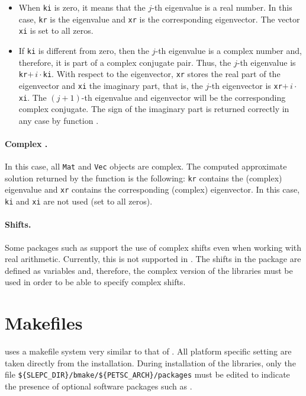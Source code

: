 \begin{itemize}
\item	When \texttt{ki} is zero, it means that the $j$-th eigenvalue is a real number. In this case, \texttt{kr} is the eigenvalue and \texttt{xr} is the corresponding eigenvector. The vector \texttt{xi} is set to all zeros.

\item	If \texttt{ki} is different from zero, then the $j$-th eigenvalue is a complex number and, therefore, it is part of a complex conjugate pair. Thus, the $j$-th eigenvalue is \texttt{kr}$+\,i\cdot$\texttt{ki}.
With respect to the eigenvector, \texttt{xr} stores the real part of the eigenvector and \texttt{xi} the imaginary part, that is, the $j$-th eigenvector is \texttt{xr}$+\,i\cdot$\texttt{xi}. The $(j+1)$-th eigenvalue and eigenvector will be the corresponding complex conjugate. The sign of the imaginary part is returned correctly in any case by function .
\end{itemize}

\paragraph{Complex \slepc.} In this case, all \texttt{Mat} and \texttt{Vec} objects are complex. The computed approximate solution returned by the function  is the following: \texttt{kr} contains the (complex) eigenvalue and \texttt{xr} contains the corresponding (complex) eigenvector. In this case, \texttt{ki} and \texttt{xi} are not used (set to all zeros).

\paragraph{Shifts.} Some packages such as \arpack{} support the use of complex shifts even when working with real arithmetic. Currently, this is not supported in \slepc. The shifts in the  package are defined as  variables and, therefore, the complex version of the libraries must be used in order to be able to specify complex shifts.

\section{Makefiles}

	\slepc uses a makefile system very similar to that of \petsc. All platform specific setting are taken directly from the \petsc{} installation. During installation of the \slepc libraries, only the file \Verb!${SLEPC_DIR}/bmake/${PETSC_ARCH}/packages! must be edited to indicate the presence of optional software packages such as \arpack.

